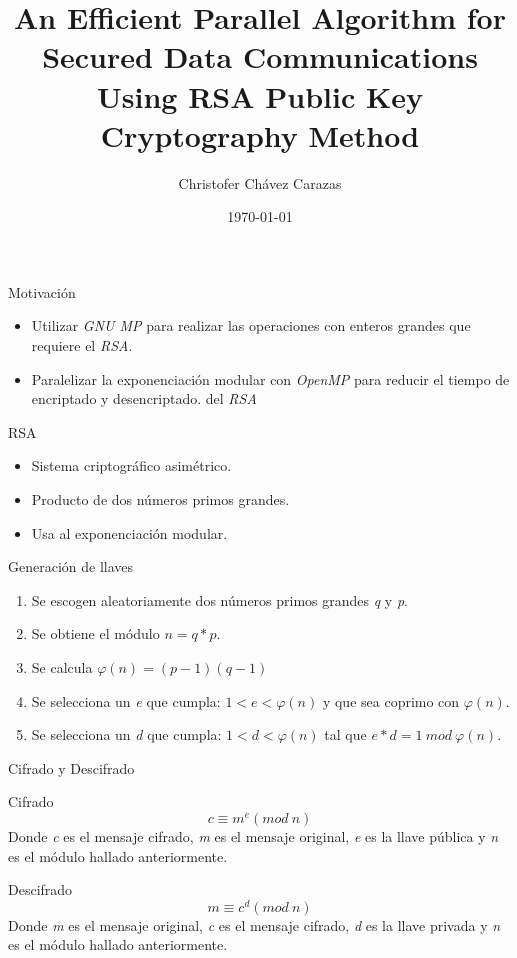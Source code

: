 \documentclass{beamer}c
\title{An Efficient Parallel Algorithm for Secured Data Communications Using RSA Public Key Cryptography Method}
\author{Christofer Chávez Carazas}
\institute[Universidad Nacional de San Agustín]
\date{\today}
\begin{document}
\begin{frame}
  \titlepage
\end{frame}

\begin{frame}{Motivación}
  \begin{itemize}
   \item Utilizar \textit{GNU MP} para realizar las operaciones con enteros grandes que requiere el \textit{RSA}.
   \item Paralelizar la exponenciación modular con \textit{OpenMP} para reducir el tiempo de encriptado y desencriptado.
   del \textit{RSA}
  \end{itemize}
\end{frame}

\begin{frame}{RSA}
 \begin{itemize}
  \item Sistema criptográfico asimétrico.
  \item Producto de dos números primos grandes.
  \item Usa al exponenciación modular.
 \end{itemize}
\end{frame}

\begin{frame}{Generación de llaves}
  \begin{enumerate}
   \item Se escogen aleatoriamente dos números primos grandes \textit{q} y \textit{p}.
   \item Se obtiene el módulo $n = q * p$.
   \item Se calcula  $\varphi(n) = (p-1)(q-1)$
   \item Se selecciona un \textit{e} que cumpla: $1 < e < \varphi(n)$ y que sea coprimo con $\varphi(n)$.
   \item Se selecciona un \textit{d} que cumpla: $1 < d < \varphi(n)$ tal que $e*d = 1\:mod\:\varphi(n)$.
  \end{enumerate}
\end{frame}

\begin{frame}{Cifrado y Descifrado}
  \begin{block}{Cifrado}
    $$c \equiv m^{e} (mod\:n)$$ 
    Donde \textit{c} es el mensaje cifrado, \textit{m} es el mensaje original, \textit{e} es la llave pública y
    \textit{n} es el módulo hallado anteriormente.
  \end{block}
  \begin{block}{Descifrado}
   $$m \equiv c^{d} (mod\:n)$$
   Donde \textit{m} es el mensaje original, \textit{c} es el mensaje cifrado, \textit{d} es la llave privada y
   \textit{n} es el módulo hallado anteriormente.
  \end{block}
\end{frame}
\end{document}
